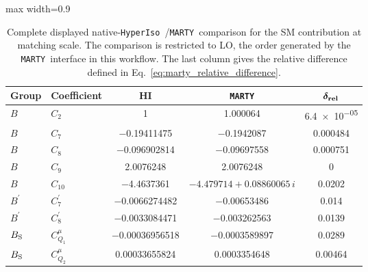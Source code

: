 \documentclass[preprint,11pt]{elsarticle}
\newcommand{\hi}{\texttt{HyperIso}}
\newcommand{\mty}{\texttt{MARTY}}
\begin{document}
\begin{table}[!ht]
\centering
\small
\setlength{\tabcolsep}{4pt}
\renewcommand{\arraystretch}{1.08}
\begin{adjustbox}{max width=0.9\textwidth}
\begin{tabular}{llccc}
\hline
\textbf{Group} & \textbf{Coefficient} & \textbf{HI} & \textbf{\mty} & \(\boldsymbol{\delta_{\rm rel}}\) \\
\hline
\(B\) & \(C_{2}\) & \num{1} & \num{1.000064} & \num{6.4e-05} \\
\(B\) & \(C_{7}\) & \num{-0.19411475} & \num{-0.1942087} & \num{0.000484} \\
\(B\) & \(C_{8}\) & \num{-0.096902814} & \num{-0.09697558} & \num{0.000751} \\
\(B\) & \(C_{9}\) & \num{2.0076248} & \num{2.0076248} & \num{0} \\
\(B\) & \(C_{10}\) & \num{-4.4637361} & \(\num{-4.479714}+\num{0.08860065}\,i\) & \num{0.0202} \\
\(B^\prime\) & \(C^\prime_{7}\) & \num{-0.0066274482} & \num{-0.00653486} & \num{0.014} \\
\(B^\prime\) & \(C^\prime_{8}\) & \num{-0.0033084471} & \num{-0.003262563} & \num{0.0139} \\
\(B_{\rm S}\) & \(C_{Q_1}^{\mu}\) & \num{-0.00036956518} & \num{-0.0003589897} & \num{0.0289} \\
\(B_{\rm S}\) & \(C_{Q_2}^{\mu}\) & \num{0.00033655824} & \num{0.0003354648} & \num{0.00464} \\
\hline
\end{tabular}
\end{adjustbox}
\caption{Complete displayed native-\hi~/\mty~comparison for the SM contribution at matching scale.  The comparison is restricted to LO, the order generated by the \mty~interface in this workflow.  The last column gives the relative difference defined in Eq.~\ref{eq:marty_relative_difference}.}
\label{tab:comparison_marty_full_sm}
\end{table}
\end{document}
